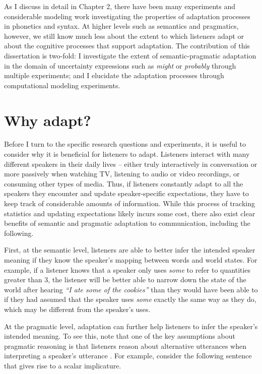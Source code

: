 As I discuss in detail in Chapter 2, there have been many experiments and considerable modeling work investigating the properties of adaptation processes in phonetics and syntax. At higher levels such as semantics and pragmatics, however, we still know much less about the extent to which listeners adapt or about the cognitive processes that support adaptation. The contribution of this dissertation is two-fold: I investigate the extent of semantic-pragmatic adaptation in the domain of uncertainty expressions such as \textit{might} or \textit{probably} through multiple experiments; and I elucidate the adaptation processes through computational modeling experiments. 

\section{Why adapt?}
\label{sec:why-adapt}

Before I turn to the specific research questions and experiments, it is useful to consider why it is beneficial for listeners to adapt. Listeners interact with many different speakers in their daily lives -- either truly interactively in conversation or more passively when watching TV, listening to audio or video recordings, or consuming other types of media. Thus, if listeners constantly adapt to all the speakers they encounter and update speaker-specific expectations, they have to keep track of considerable amounts of information. While this process of tracking statistics and updating expectations likely incurs some cost, there also exist clear benefits of semantic and pragmatic adaptation to communication, including the following.

First, at the semantic level, listeners are able to better infer the intended speaker meaning if they know the speaker's mapping between words and world states. For example, if a listener knows that a speaker only uses \emph{some} to refer to quantities greater than 3, the listener will be better able to narrow down the state of the world after hearing \emph{``I ate some of the cookies''} than they would have been able to if they had assumed that the speaker uses \emph{some} exactly the same way as they do, which may be different from the speaker's uses.

At the pragmatic level, adaptation can further help listeners to infer the speaker's intended meaning. To see this, note that one of the key assumptions about pragmatic reasoning is that listeners reason about alternative utterances when interpreting a speaker's utterance \cite{Grice1975, Horn1984}. For example, consider the following sentence that gives rise to a scalar implicature.

